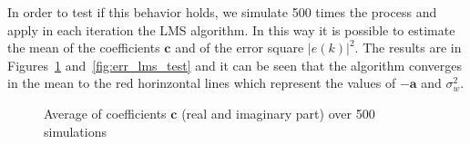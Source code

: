 \documentclass[10pt]{article}
\numberwithin{equation}{section}
\begin{document}
In order to test if this behavior holds, we simulate 500 times the process and apply in each iteration the LMS algorithm. In this way it is possible to estimate the mean of the coefficients $\mathbf{c}$ and of the error square $|e(k)|^2$. The results are in Figures~\ref{fig:coeff_lms_test} and~\ref{fig:err_lms_test} and it can be seen that the algorithm converges in the mean to the red horinzontal lines which represent the values of $-\mathbf{a}$ and $\sigma_w^2$.

\begin{figure}[h!]
\centering
 	 \caption{Average of coefficients $\mathbf{c}$ (real and imaginary part) over 500 simulations}
  \label{fig:coeff_lms_test}
\end{figure}
\end{document}

